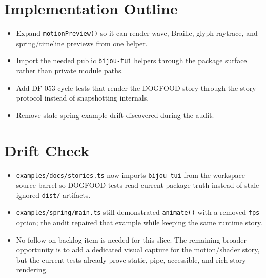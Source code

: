 \section{Implementation Outline}\label{record-098-implementation-outline}

\begin{itemize}
\tightlist
\item
  Expand \texttt{m\allowbreak{}o\allowbreak{}t\allowbreak{}i\allowbreak{}o\allowbreak{}n\allowbreak{}P\allowbreak{}r\allowbreak{}e\allowbreak{}v\allowbreak{}i\allowbreak{}e\allowbreak{}w\allowbreak{}(\allowbreak{})} so it can render wave, Braille, glyph-raytrace, and spring/timeline previews from one helper.
\item
  Import the needed public \texttt{b\allowbreak{}i\allowbreak{}j\allowbreak{}o\allowbreak{}u\allowbreak{}-\allowbreak{}t\allowbreak{}u\allowbreak{}i} helpers through the package surface rather than private module paths.
\item
  Add DF-053 cycle tests that render the DOGFOOD story through the story protocol instead of snapshotting internals.
\item
  Remove stale spring-example drift discovered during the audit.
\end{itemize}

\section{Drift Check}\label{record-098-drift-check}

\begin{itemize}
\tightlist
\item
  \texttt{e\allowbreak{}x\allowbreak{}a\allowbreak{}m\allowbreak{}p\allowbreak{}l\allowbreak{}e\allowbreak{}s\allowbreak{}/\allowbreak{}d\allowbreak{}o\allowbreak{}c\allowbreak{}s\allowbreak{}/\allowbreak{}s\allowbreak{}t\allowbreak{}o\allowbreak{}r\allowbreak{}i\allowbreak{}e\allowbreak{}s\allowbreak{}.\allowbreak{}t\allowbreak{}s} now imports \texttt{b\allowbreak{}i\allowbreak{}j\allowbreak{}o\allowbreak{}u\allowbreak{}-\allowbreak{}t\allowbreak{}u\allowbreak{}i} from the workspace source barrel so DOGFOOD tests read current package truth instead of stale ignored \texttt{d\allowbreak{}i\allowbreak{}s\allowbreak{}t\allowbreak{}/} artifacts.
\item
  \texttt{e\allowbreak{}x\allowbreak{}a\allowbreak{}m\allowbreak{}p\allowbreak{}l\allowbreak{}e\allowbreak{}s\allowbreak{}/\allowbreak{}s\allowbreak{}p\allowbreak{}r\allowbreak{}i\allowbreak{}n\allowbreak{}g\allowbreak{}/\allowbreak{}m\allowbreak{}a\allowbreak{}i\allowbreak{}n\allowbreak{}.\allowbreak{}t\allowbreak{}s} still demonstrated \texttt{a\allowbreak{}n\allowbreak{}i\allowbreak{}m\allowbreak{}a\allowbreak{}t\allowbreak{}e\allowbreak{}(\allowbreak{})} with a removed \texttt{f\allowbreak{}p\allowbreak{}s} option; the audit repaired that example while keeping the same runtime story.
\item
  No follow-on backlog item is needed for this slice. The remaining broader opportunity is to add a dedicated visual capture for the motion/shader story, but the current tests already prove static, pipe, accessible, and rich-story rendering.
\end{itemize}

